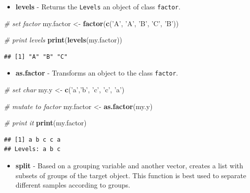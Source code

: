\documentclass[11pt,]{book}
\newenvironment{Shaded}{\begin{snugshade}}{\end{snugshade}}
\newcommand{\KeywordTok}[1]{\textcolor[rgb]{0.27,0.27,0.27}{\textbf{#1}}}
\newcommand{\StringTok}[1]{\textcolor[rgb]{0.5,0.5,0.5}{#1}}
\newcommand{\CommentTok}[1]{\textcolor[rgb]{0.56,0.35,0.01}{\textit{#1}}}
\newcommand{\NormalTok}[1]{#1}
\providecommand{\tightlist}{%
  \setlength{\itemsep}{0pt}\setlength{\parskip}{0pt}}
\begin{document}
\begin{itemize}
\tightlist
\item
  \textbf{levels} - Returns the \texttt{Levels} an object of class
  \texttt{factor}. 
\end{itemize}

\begin{Shaded}
\begin{Highlighting}[]
\CommentTok{# set factor}
\NormalTok{my.factor <-}\StringTok{ }\KeywordTok{factor}\NormalTok{(}\KeywordTok{c}\NormalTok{(}\StringTok{'A'}\NormalTok{, }\StringTok{'A'}\NormalTok{, }\StringTok{'B'}\NormalTok{, }\StringTok{'C'}\NormalTok{, }\StringTok{'B'}\NormalTok{))}

\CommentTok{# print levels}
\KeywordTok{print}\NormalTok{(}\KeywordTok{levels}\NormalTok{(my.factor))}
\end{Highlighting}
\end{Shaded}

\begin{verbatim}
## [1] "A" "B" "C"
\end{verbatim}

\begin{itemize}
\tightlist
\item
  \textbf{as.factor} - Transforms an object to the class
  \texttt{factor}. 
\end{itemize}

\begin{Shaded}
\begin{Highlighting}[]
\CommentTok{# set char}
\NormalTok{my.y <-}\StringTok{ }\KeywordTok{c}\NormalTok{(}\StringTok{'a'}\NormalTok{,}\StringTok{'b'}\NormalTok{, }\StringTok{'c'}\NormalTok{, }\StringTok{'c'}\NormalTok{, }\StringTok{'a'}\NormalTok{)}

\CommentTok{# mutate to factor}
\NormalTok{my.factor <-}\StringTok{ }\KeywordTok{as.factor}\NormalTok{(my.y)}

\CommentTok{# print it}
\KeywordTok{print}\NormalTok{(my.factor)}
\end{Highlighting}
\end{Shaded}

\begin{verbatim}
## [1] a b c c a
## Levels: a b c
\end{verbatim}

\begin{itemize}
\tightlist
\item
  \textbf{split} - Based on a grouping variable and another vector,
  creates a list with subsets of groups of the target object. This
  function is best used to separate different samples according to
  groups. 
\end{itemize}
\end{document}
